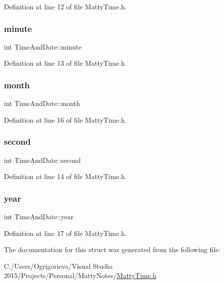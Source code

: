 Definition at line 12 of file Matty\+Time.\+h.

\hypertarget{structTimeAndDate_ac6e3bb984cb985e0e41ce66ebf9184d6}{}\label{structTimeAndDate_ac6e3bb984cb985e0e41ce66ebf9184d6} 
\subsubsection{\texorpdfstring{minute}{minute}}
{\footnotesize\ttfamily int Time\+And\+Date\+::minute}



Definition at line 13 of file Matty\+Time.\+h.

\hypertarget{structTimeAndDate_afe5462f6d779ba509ca41af16c75b4d6}{}\label{structTimeAndDate_afe5462f6d779ba509ca41af16c75b4d6} 
\subsubsection{\texorpdfstring{month}{month}}
{\footnotesize\ttfamily int Time\+And\+Date\+::month}



Definition at line 16 of file Matty\+Time.\+h.

\hypertarget{structTimeAndDate_a33e8f3ab1792ff99e778e5e07dc89a32}{}\label{structTimeAndDate_a33e8f3ab1792ff99e778e5e07dc89a32} 
\subsubsection{\texorpdfstring{second}{second}}
{\footnotesize\ttfamily int Time\+And\+Date\+::second}



Definition at line 14 of file Matty\+Time.\+h.

\hypertarget{structTimeAndDate_a6acff62930f252e65187b16f559662b9}{}\label{structTimeAndDate_a6acff62930f252e65187b16f559662b9} 
\subsubsection{\texorpdfstring{year}{year}}
{\footnotesize\ttfamily int Time\+And\+Date\+::year}



Definition at line 17 of file Matty\+Time.\+h.



The documentation for this struct was generated from the following file\+:\begin{DoxyCompactItemize}
\item 
C\+:/\+Users/\+Ogrigorieva/\+Visual Studio 2015/\+Projects/\+Personal/\+Matty\+Notes/\hyperlink{MattyTime_8h}{Matty\+Time.\+h}\end{DoxyCompactItemize}
